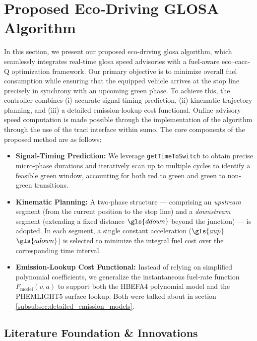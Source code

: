 \section{Proposed Eco‐Driving GLOSA Algorithm}
\label{sec:Proposed_Eco_Driving_GLOSA_Algorithm}

In this section, we present our proposed eco‐driving \ac{glosa} algorithm, which seamlessly integrates real‐time \ac{glosa} speed advisories with a fuel‐aware eco–\ac{cacc}‐Q optimization framework. Our primary objective is to minimize overall fuel consumption while ensuring that the equipped vehicle arrives at the stop line precisely in synchrony with an upcoming green phase. To achieve this, the controller combines (i) accurate signal‐timing prediction, (ii) kinematic trajectory planning, and (iii) a detailed emission‐lookup cost functional. Online advisory speed computation is made possible through the implementation of the algorithm through the use of the \ac{traci} interface within \ac{sumo}.
\mynewline
The core components of the proposed method are as follows:
\begin{itemize}
  \item \textbf{Signal‐Timing Prediction:} We leverage \texttt{getTimeToSwitch} to obtain precise micro‐phase durations and iteratively scan up to multiple cycles to identify a feasible green window, accounting for both red to green and green to non‐green transitions.
  \item \textbf{Kinematic Planning:} A two‐phase structure --- comprising an \emph{upstream} segment (from the current position to the stop line) and a \emph{downstream} segment (extending a fixed distance $\gls{ddown}$ beyond the junction) --- is adopted. In each segment, a single constant acceleration ($\gls{aup}$  $\gls{adown}$) is selected to minimize the integral fuel cost over the corresponding time interval.
  \item \textbf{Emission‐Lookup Cost Functional:} Instead of relying on simplified polynomial coefficients, we generalize the instantaneous fuel‐rate function $F_{\text{model}}(v,a)$ to support both the HBEFA4 polynomial model and the PHEMLIGHT5 surface lookup. Both were talked about in section \ref{subsubsec:detailed_emission_models}.
\end{itemize}

\subsection{Literature Foundation \& Innovations}
\label{sec:EcoGlosa_Background}

